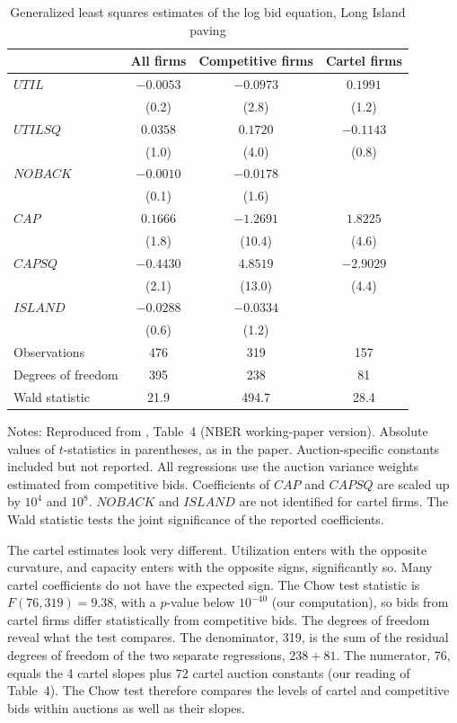 \begin{table}[htbp]
\centering
\caption{Generalized least squares estimates of the log bid equation, Long Island paving}\label{tab:13-pz-t4}
\small
\begin{tabular}{@{}lccc@{}}
\toprule
 & All firms & Competitive firms & Cartel firms\\
\midrule
$\mathit{UTIL}$   & $-0.0053$ & $-0.0973$ & $0.1991$\\
                  & (0.2) & (2.8) & (1.2)\\
$\mathit{UTILSQ}$ & $0.0358$ & $0.1720$ & $-0.1143$\\
                  & (1.0) & (4.0) & (0.8)\\
$\mathit{NOBACK}$ & $-0.0010$ & $-0.0178$ & \\
                  & (0.1) & (1.6) & \\
$\mathit{CAP}$    & $0.1666$ & $-1.2691$ & $1.8225$\\
                  & (1.8) & (10.4) & (4.6)\\
$\mathit{CAPSQ}$  & $-0.4430$ & $4.8519$ & $-2.9029$\\
                  & (2.1) & (13.0) & (4.4)\\
$\mathit{ISLAND}$ & $-0.0288$ & $-0.0334$ & \\
                  & (0.6) & (1.2) & \\
\midrule
Observations       & 476 & 319 & 157\\
Degrees of freedom & 395 & 238 & 81\\
Wald statistic     & 21.9 & 494.7 & 28.4\\
\bottomrule
\end{tabular}

\smallskip
\begin{minipage}{0.86\textwidth}\footnotesize
Notes: Reproduced from \citet{PorterZona1993}, Table~4 (NBER working-paper version). Absolute values of
$t$-statistics in parentheses, as in the paper. Auction-specific constants included but not reported. All
regressions use the auction variance weights estimated from competitive bids. Coefficients of $\mathit{CAP}$ and
$\mathit{CAPSQ}$ are scaled up by $10^4$ and $10^8$. $\mathit{NOBACK}$ and $\mathit{ISLAND}$ are not identified for
cartel firms. The Wald statistic tests the joint significance of the reported coefficients.
\end{minipage}
\end{table}

The cartel estimates look very different. Utilization enters with the opposite curvature, and capacity enters
with the opposite signs, significantly so. Many cartel coefficients do not have the expected sign. The Chow test
statistic is $F(76, 319) = 9.38$, with a $p$-value below $10^{-40}$ (our computation), so bids from cartel firms
differ statistically from competitive bids. The degrees of freedom reveal what the test compares. The denominator,
319, is the sum of the residual degrees of freedom of the two separate regressions, $238 + 81$. The numerator, 76,
equals the 4 cartel slopes plus 72 cartel auction constants (our reading of Table~4). The Chow test therefore
compares the levels of cartel and competitive bids within auctions as well as their slopes.

